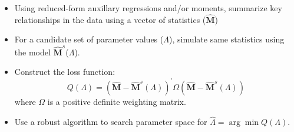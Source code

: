 \documentclass[notes=show]{beamer}
\begin{document}
\begin{frame}%



\begin{itemize}
\item Using reduced-form auxillary regressions and/or moments, summarize key
relationships in the data using a vector of statistics ($\widehat{\mathbf{M}}
$)

\item For a candidate set of parameter values ($\Lambda $), simulate same
statistics using the model $\widehat{\mathbf{M}}^{s}$($\Lambda $).

\item Construct the loss function: 
\[
Q(\Lambda )=\left( \widehat{\mathbf{M}}-\widehat{\mathbf{M}}^{s}(\Lambda
)\right) ^{\prime }\Omega \left( \widehat{\mathbf{M}}-\widehat{\mathbf{M}}%
^{s}(\Lambda )\right) 
\]%
where $\Omega $ is a positive definite weighting matrix.

\item Use a robust algorithm to search parameter space for $\widehat{\Lambda 
}=\arg \min Q(\Lambda ).$
\end{itemize}

\end{frame}%
\end{document}
